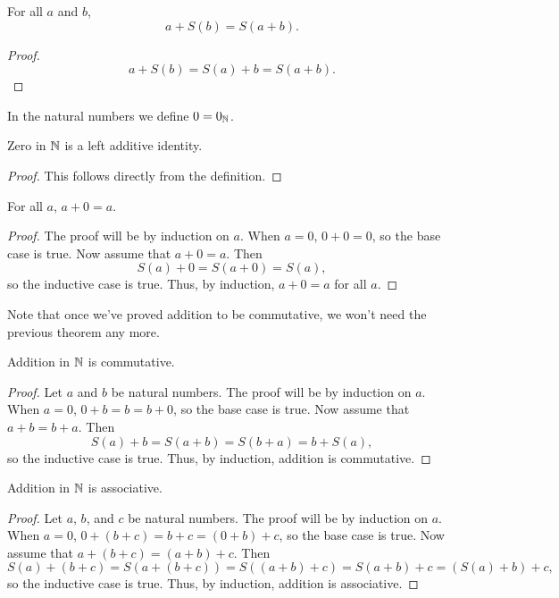 \documentclass[../math.tex]{subfiles}
\begin{document}
\begin{theorem}
    For all $a$ and $b$,
    \[
        a + S(b) = S(a + b).
    \]
\end{theorem}
\begin{proof}
    \[
        a + S(b) = S(a) + b = S(a + b).
    \]
\end{proof}

\begin{instance}
    In the natural numbers we define $0 = 0_{\mathbb{N}}$.
\end{instance}

\begin{instance}
    Zero in $\mathbb{N}$ is a left additive identity.
\end{instance}
\begin{proof}
    This follows directly from the definition.
\end{proof}

\begin{theorem}
    For all $a$, $a + 0 = a$.
\end{theorem}
\begin{proof}
    The proof will be by induction on $a$.  When $a = 0$, $0 + 0 = 0$, so the
    base case is true.  Now assume that $a + 0 = a$.  Then
    \[
        S(a) + 0 = S(a + 0) = S(a),
    \]
    so the inductive case is true.  Thus, by induction, $a + 0 = a$ for all $a$.
\end{proof}
Note that once we've proved addition to be commutative, we won't need the
previous theorem any more.

\begin{instance}
    Addition in $\mathbb{N}$ is commutative.
\end{instance}
\begin{proof}
    Let $a$ and $b$ be natural numbers.  The proof will be by induction on $a$.
    When $a = 0$, $0 + b = b = b + 0$, so the base case is true.  Now assume
    that $a + b = b + a$.  Then
    \[
        S(a) + b = S(a + b) = S(b + a) = b + S(a),
    \]
    so the inductive case is true.  Thus, by induction, addition is commutative.
\end{proof}

\begin{instance}
    Addition in $\mathbb{N}$ is associative.
\end{instance}
\begin{proof}
    Let $a$, $b$, and $c$ be natural numbers.  The proof will be by induction on
    $a$.  When $a = 0$, $0 + (b + c) = b + c = (0 + b) + c$, so the base case is
    true.  Now assume that $a + (b + c) = (a + b) + c$.  Then
    \[
        S(a) + (b + c) = S(a + (b + c)) = S((a + b) + c) = S(a + b) + c
        = (S(a) + b) + c,
    \]
    so the inductive case is true.  Thus, by induction, addition is associative.
\end{proof}
\end{document}

